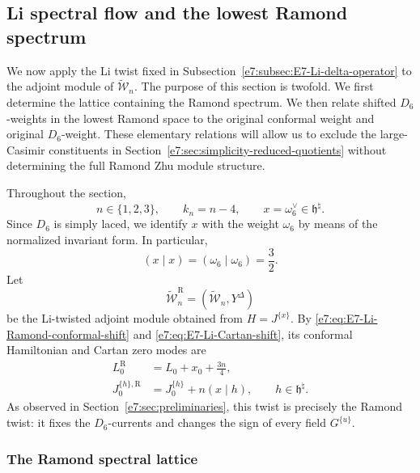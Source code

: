 \documentclass[11pt,reqno]{amsart}
\theoremstyle{definition}
\theoremstyle{remark}
\begin{document}
\subsection{Li spectral flow and the lowest Ramond spectrum}
\label{e7:sec:Li-spectral-flow}

We now apply the Li twist fixed in
Subsection~\ref{e7:subsec:E7-Li-delta-operator} to the adjoint module of
\(\widetilde{\mathcal W}_n\).  The purpose of this section is twofold.  We
first determine the lattice containing the Ramond spectrum.  We then relate
shifted \(D_6\)-weights in the lowest Ramond space to the original conformal
weight and original \(D_6\)-weight.  These elementary relations will allow
us to exclude the large-Casimir constituents in
Section~\ref{e7:sec:simplicity-reduced-quotients} without determining the full
Ramond Zhu module structure.

Throughout the section,
\begin{equation*}
  n\in\{1,2,3\},
  \qquad
  k_n=n-4,
  \qquad
  x=\omega_6^\vee\in\mathfrak h^\natural.
\end{equation*}
Since \(D_6\) is simply laced, we identify \(x\) with the weight
\(\omega_6\) by means of the normalized invariant form.  In particular,
\begin{equation*}
  (x\mid x)=(\omega_6\mid\omega_6)=\frac32.
\end{equation*}
Let
\begin{equation*}
  \widetilde{\mathcal W}_n^{\mathrm R}
  =
  (\widetilde{\mathcal W}_n,Y^{\Delta})
\end{equation*}
be the Li-twisted adjoint module obtained from
\(H=J^{\{x\}}\).  By
\eqref{e7:eq:E7-Li-Ramond-conformal-shift} and
\eqref{e7:eq:E7-Li-Cartan-shift}, its conformal Hamiltonian and Cartan zero
modes are
\begin{align}
  L_0^{\mathrm R}
  &=L_0+x_0+\frac{3n}{4},
  \label{e7:eq:E7-section5-Ramond-Hamiltonian}\\
  J_0^{\{h\},\mathrm R}
  &=J_0^{\{h\}}+n(x\mid h),
  \qquad h\in\mathfrak h^\natural.
  \label{e7:eq:E7-section5-shifted-Cartan-action}
\end{align}
As observed in Section~\ref{e7:sec:preliminaries}, this twist is precisely the
Ramond twist: it fixes the \(D_6\)-currents and changes the sign of every
field \(G^{\{u\}}\).

\subsubsection{The Ramond spectral lattice}
\end{document}
